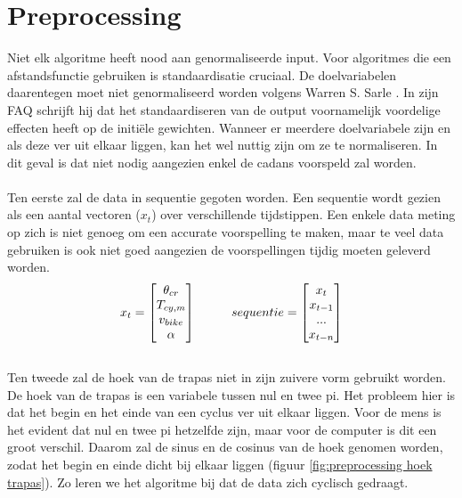 \section{Preprocessing}
Niet elk algoritme heeft nood aan genormaliseerde input. Voor algoritmes die een afstandsfunctie gebruiken is standaardisatie cruciaal. De doelvariabelen daarentegen moet niet genormaliseerd worden volgens Warren S. Sarle \cite{preprocessing faq}. In zijn FAQ schrijft hij dat het standaardiseren van de output voornamelijk voordelige effecten heeft op de initiële gewichten. Wanneer er meerdere doelvariabele zijn en als deze ver uit elkaar liggen, kan het wel nuttig zijn om ze te normaliseren. In dit geval is dat niet nodig aangezien enkel de cadans voorspeld zal worden.
\\\\
\noindent Ten eerste zal de data in sequentie gegoten worden. Een sequentie wordt gezien als een aantal vectoren ($x_t$) over verschillende tijdstippen. Een enkele data meting op zich is niet genoeg om een accurate voorspelling te maken, maar te veel data gebruiken is ook niet goed aangezien de voorspellingen tijdig moeten geleverd worden.
\\
\begin{gather*}
x_t = \begin{bmatrix} 
       \theta _{cr} \\ T_{cy,m} \\ v_{bike} \\ \alpha
     \end{bmatrix} \hspace*{1cm}
sequentie = \begin{bmatrix} 
       x_t \\ x_{t-1} \\ ... \\ x_{t-n}
     \end{bmatrix} 
\end{gather*}
\\
\noindent Ten tweede zal de hoek van de trapas niet in zijn zuivere vorm gebruikt worden. De hoek van de trapas is een variabele tussen nul en twee pi. Het probleem hier is dat het begin en het einde van een cyclus ver uit elkaar liggen. Voor de mens is het evident dat nul en twee pi hetzelfde zijn, maar voor de computer is dit een groot verschil. Daarom zal de sinus en de cosinus van de hoek genomen worden, zodat het begin en einde dicht bij elkaar liggen (figuur \ref{fig:preprocessing hoek trapas}). Zo leren we het algoritme bij dat de data zich cyclisch gedraagt.

